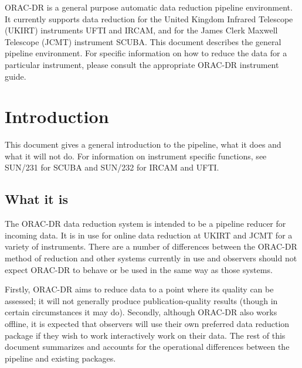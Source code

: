 \documentclass[twoside,11pt]{article}
\newcommand{\stardocinitials}  {SUN}
\newcommand{\stardocnumber}    {230.1}
\newcommand{\stardocabstract}  {ORAC-DR is a general purpose
automatic data reduction pipeline environment. It currently supports
data reduction for the United Kingdom Infrared Telescope (UKIRT)
instruments UFTI and IRCAM, and for the James Clerk Maxwell Telescope
(JCMT) instrument SCUBA. This document describes the general pipeline
environment. For specific information on how to reduce the data for a particular
instrument, please consult the appropriate ORAC-DR instrument guide.}
\newcommand{\stardocname}{\stardocinitials /\stardocnumber}
\newcommand{\underscore}{\leavevmode\kern.04em\vbox{\hrule width 0.4em height 0.3pt}}
\newenvironment{latexonly}{}{}
\newcommand{\xref}[3]{#1}
\newcommand{\xlabel}[1]{}
\renewcommand{\_}{\texttt{\symbol{95}}}
\renewcommand{\thepage}{\roman{page}}
\begin{document}
\stardocabstract
  \newpage
  \begin{latexonly}
    \setlength{\parskip}{0mm}
    \tableofcontents
    \setlength{\parskip}{\medskipamount}
    \markboth{\stardocname}{\stardocname}
  \end{latexonly}
\cleardoublepage
\renewcommand{\thepage}{\arabic{page}}
\setcounter{page}{1}



\section{Introduction\xlabel{introduction}}

This document gives a general introduction to the pipeline, what it
does and what it will not do. For information on instrument
specific functions, see \xref{SUN/231}{sun231}{} for SCUBA and
\xref{SUN/232}{sun232}{} for IRCAM and UFTI.

\subsection*{What it is}%

The ORAC-DR data reduction system is intended to be a pipeline reducer
for incoming data. It is in use for online data reduction at UKIRT and
JCMT for a variety of instruments. There are a number of differences
between the ORAC-DR method of reduction and other systems currently in
use and observers should not expect ORAC-DR to behave or be used in
the same way as those systems.

Firstly, ORAC-DR aims to reduce data to a point where its quality can
be assessed; it will not generally produce publication-quality results
(though in certain circumstances it may do).  Secondly, although
ORAC-DR also works offline, it is expected that observers will use
their own preferred data reduction package if they wish to work
interactively work on their data. The rest of this document summarizes
and accounts for the operational differences between the pipeline and
existing packages.
\end{document}
